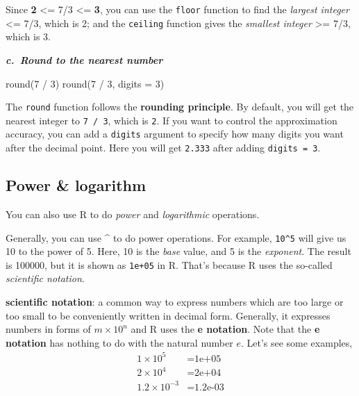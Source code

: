 \documentclass[
]{book}
\newenvironment{Shaded}{\begin{snugshade}}{\end{snugshade}}
\newcommand{\AttributeTok}[1]{\textcolor[rgb]{0.77,0.63,0.00}{#1}}
\newcommand{\DecValTok}[1]{\textcolor[rgb]{0.00,0.00,0.81}{#1}}
\newcommand{\FunctionTok}[1]{\textcolor[rgb]{0.00,0.00,0.00}{#1}}
\newcommand{\NormalTok}[1]{#1}
\newcommand{\SpecialCharTok}[1]{\textcolor[rgb]{0.00,0.00,0.00}{#1}}
\newenvironment{infobox}[1]
  {
  \begin{itemize}
  \renewcommand{\labelitemi}{
    \raisebox{-.7\height}[0pt][0pt]{
      {\setkeys{Gin}{width=3em,keepaspectratio}
        \texttt{[image: pics/\#1]}}
    }
  }
  \setlength{\fboxsep}{1em}
  \begin{blackbox}
  \item
  }
  {
  \end{blackbox}
  \end{itemize}
  }
\newenvironment{blackbox}{
  \definecolor{shadecolor}{rgb}{0, 0, 0}  %
  \color{white}
  \begin{shaded}}
 {\end{shaded}}
\begin{document}
Since \textbf{2} \textless= 7/3 \textless= \textbf{3}, you can use the \texttt{floor} function to find the \emph{largest integer} \textless= 7/3, which is 2; and the \texttt{ceiling} function gives the \emph{smallest integer} \textgreater= 7/3, which is 3.

\textbf{\emph{c.~Round to the nearest number}}

\begin{Shaded}
\begin{Highlighting}[]
\FunctionTok{round}\NormalTok{(}\DecValTok{7} \SpecialCharTok{/} \DecValTok{3}\NormalTok{)   }
\FunctionTok{round}\NormalTok{(}\DecValTok{7} \SpecialCharTok{/} \DecValTok{3}\NormalTok{, }\AttributeTok{digits =} \DecValTok{3}\NormalTok{)}
\end{Highlighting}
\end{Shaded}

The \texttt{round} function follows the \textbf{rounding principle}. By default, you will get the nearest integer to \texttt{7\ /\ 3}, which is \texttt{2}. If you want to control the approximation accuracy, you can add a \texttt{digits} argument to specify how many digits you want after the decimal point. Here you will get \texttt{2.333} after adding \texttt{digits\ =\ 3}.

\hypertarget{power-logarithm}{%
\subsection{Power \& logarithm}\label{power-logarithm}}

You can also use R to do \emph{power} and \emph{logarithmic} operations.

Generally, you can use \textbf{\^{}} to do power operations. For example, \texttt{10\^{}5} will give us 10 to the power of 5. Here, 10 is the \emph{base} value, and 5 is the \emph{exponent}. The result is 100000, but it is shown as \texttt{1e+05} in R. That's because R uses the so-called \emph{scientific notation}.

\begin{infobox}{caution}
\textbf{scientific notation}: a common way to express numbers which are too large or too small to be conveniently written in decimal form. Generally, it expresses numbers in forms of \(m \times 10^n\) and R uses the \textbf{e notation}. Note that the \textbf{e notation} has nothing to do with the natural number \(e\). Let's see some examples,
\begin{align}
1 \times 10^5 &= \mbox{1e+05}\\
2 \times 10^4 &= \mbox{2e+04}\\
1.2 \times 10^{-3} &= \mbox{1.2e-03}
\end{align}

\end{infobox}
\end{document}
